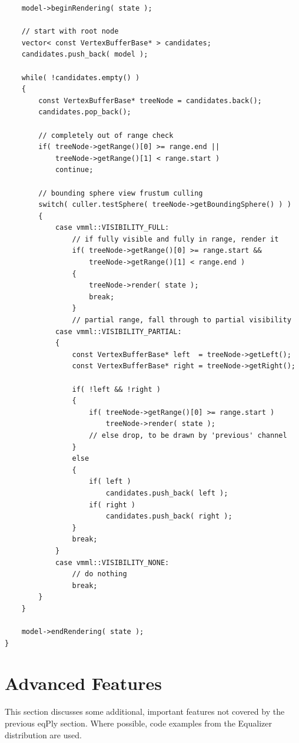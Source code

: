 \documentclass[10pt,a4]{scrartcl}
\begin{document}
{\footnotesize\begin{lstlisting}
    model->beginRendering( state );
        
    // start with root node
    vector< const VertexBufferBase* > candidates;
    candidates.push_back( model );
        
    while( !candidates.empty() )
    {
        const VertexBufferBase* treeNode = candidates.back();
        candidates.pop_back();
            
        // completely out of range check
        if( treeNode->getRange()[0] >= range.end || 
            treeNode->getRange()[1] < range.start )
            continue;
            
        // bounding sphere view frustum culling
        switch( culler.testSphere( treeNode->getBoundingSphere() ) )
        {
            case vmml::VISIBILITY_FULL:
                // if fully visible and fully in range, render it
                if( treeNode->getRange()[0] >= range.start && 
                    treeNode->getRange()[1] < range.end )
                {
                    treeNode->render( state );
                    break;
                }
                // partial range, fall through to partial visibility
            case vmml::VISIBILITY_PARTIAL:
            {
                const VertexBufferBase* left  = treeNode->getLeft();
                const VertexBufferBase* right = treeNode->getRight();
            
                if( !left && !right )
                {
                    if( treeNode->getRange()[0] >= range.start )
                        treeNode->render( state );
                    // else drop, to be drawn by 'previous' channel
                }
                else
                {
                    if( left )
                        candidates.push_back( left );
                    if( right )
                        candidates.push_back( right );
                }
                break;
            }
            case vmml::VISIBILITY_NONE:
                // do nothing
                break;
        }
    }
        
    model->endRendering( state );
}
\end{lstlisting}}


\section{Advanced Features}

This section discusses some additional, important features not covered
by the previous \textsf{eqPly} section. Where possible, code examples
from the Equalizer distribution are used.
\end{document}

